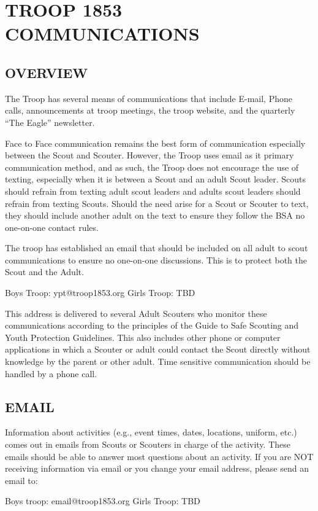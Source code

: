 \documentclass{ltxguide}
\begin{document}
\section{TROOP 1853 COMMUNICATIONS}
\subsection{OVERVIEW}
The Troop has several means of communications that include E-mail, Phone calls, announcements at troop meetings, the troop website, and the quarterly “The Eagle” newsletter.

Face to Face communication remains the best form of communication especially between the Scout and Scouter. However, the Troop uses email as it primary communication method, and as such, the Troop does not encourage the use of texting, especially when it is between a Scout and an adult Scout leader. Scouts should refrain from texting adult scout leaders and adults scout leaders should refrain from texting Scouts. Should the need arise for a Scout or Scouter to text, they should include another adult on the text to ensure they follow the \ac{BSA} no one-on-one contact rules. 

The troop has established an email that should be included on all adult to scout communications to ensure no one-on-one discussions. This is to protect both the Scout and the Adult. 

Boys Troop: ypt@troop1853.org
Girls Troop: TBD

This address is delivered to several Adult Scouters who monitor these communications according to the principles of the Guide to Safe Scouting and Youth Protection Guidelines. This also includes other phone or computer applications in which a Scouter or adult could contact the Scout directly without knowledge by the parent or other adult. Time sensitive communication should be handled by a phone call.

\subsection{EMAIL}
Information about activities (e.g., event times, dates, locations, uniform, etc.) comes out in emails from Scouts or Scouters in charge of the activity. These emails should be able to answer most questions about an activity. If you are NOT receiving information via email or you  change your email address, please send an email to:

Boys troop: email@troop1853.org
Girls Troop: TBD
\end{document}
